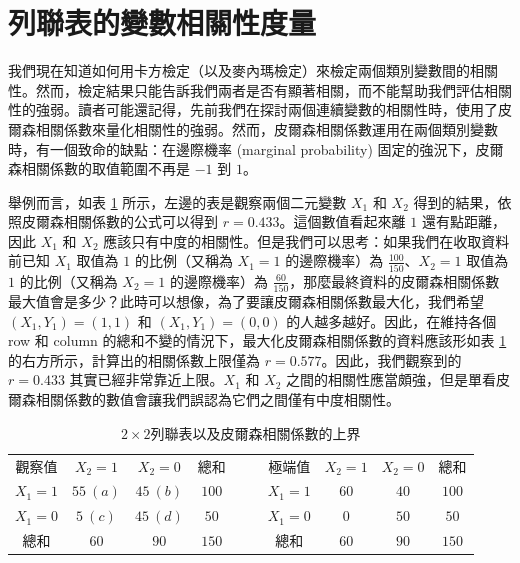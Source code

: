 \section{列聯表的變數相關性度量}
    我們現在知道如何用卡方檢定（以及麥內瑪檢定）來檢定兩個類別變數間的相關性。然而，檢定結果只能告訴我們兩者是否有顯著相關，而不能幫助我們評估相關性的強弱。讀者可能還記得，先前我們在探討兩個連續變數的相關性時，使用了皮爾森相關係數來量化相關性的強弱。然而，皮爾森相關係數運用在兩個類別變數時，有一個致命的缺點：在邊際機率 (marginal probability) 固定的強況下，皮爾森相關係數的取值範圍不再是 $-1$ 到 $1$。
    
    舉例而言，如表 \ref{tab:odds_ratio} 所示，左邊的表是觀察兩個二元變數 $X_1$ 和 $X_2$ 得到的結果，依照皮爾森相關係數的公式可以得到 $r=0.433$。這個數值看起來離 $1$ 還有點距離，因此 $X_1$ 和 $X_2$ 應該只有中度的相關性。但是我們可以思考：如果我們在收取資料前已知 $X_1$ 取值為 $1$ 的比例（又稱為 $X_1=1$ 的邊際機率）為 $\frac{100}{150}$、$X_2 = 1$ 取值為 $1$ 的比例（又稱為 $X_2=1$ 的邊際機率）為 $\frac{60}{150}$，那麼最終資料的皮爾森相關係數最大值會是多少？此時可以想像，為了要讓皮爾森相關係數最大化，我們希望 $(X_1, Y_1) = (1,1)$ 和 $(X_1, Y_1) = (0,0)$ 的人越多越好。因此，在維持各個 row 和 column 的總和不變的情況下，最大化皮爾森相關係數的資料應該形如表 \ref{tab:odds_ratio} 的右方所示，計算出的相關係數上限僅為 $r=0.577$。因此，我們觀察到的 $r=0.433$ 其實已經非常靠近上限。$X_1$ 和 $X_2$ 之間的相關性應當頗強，但是單看皮爾森相關係數的數值會讓我們誤認為它們之間僅有中度相關性。

    \bigskip

    \begin{table}[htbp]
        \begin{center}
            \begin{tabular}{c|cc|cccc|cc|c}
                \cline{1-4}\cline{7-10}
                觀察值 & $X_2=1$ & $X_2=0$ & 總和 &&& 極端值 & $X_2=1$ & $X_2=0$ & 總和\\
                \cline{1-4}\cline{7-10}
                $X_1=1$ & $55~(a)$ & $45~(b)$ & $100$ &&& $X_1=1$ & $60$ & $40$ & $100$\\
                $X_1=0$ & $5~(c)$ & $45~(d)$ & $50$ &&& $X_1=0$ & $0$ & $50$ & $50$\\
                \cline{1-4}\cline{7-10}
                總和 & $60$ & $90$ & $150$ &&& 總和 & $60$ & $90$ & $150$\\
                \cline{1-4}\cline{7-10}
            \end{tabular}
            \caption{$2 \times 2$列聯表以及皮爾森相關係數的上界\label{tab:odds_ratio}}
        \end{center}
    \end{table}

